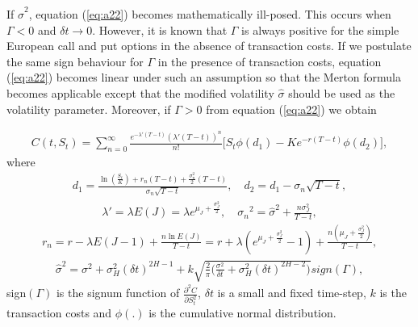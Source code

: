 \documentclass[a4paper,11pt]{amsart}
\numberwithin{equation}{section}
\theoremstyle{definition}
\theoremstyle{plain}
\theoremstyle{definition}
\newcommand{\1}{\mathbf{1}}
\begin{document}
If $\widehat{\sigma}^2$, equation (\ref{eq:a22}) becomes mathematically ill-posed. This occurs when $\Gamma<0$ and $\delta t\rightarrow 0$. However,
it is known that $\Gamma$ is always positive for the simple European call and put options in the absence of transaction costs. If
we postulate the same sign behaviour for $\Gamma$ in the presence of transaction costs, equation (\ref{eq:a22}) becomes linear under such an
assumption so that the Merton formula becomes applicable except that the modified volatility $\widehat{\sigma}$ should be used as the
volatility parameter. Moreover, if $\Gamma>0$ from equation (\ref{eq:a22}) we obtain

\begin{eqnarray}
C(t,S_t)=\sum_{n=0}^\infty\frac{e^{-\lambda'(T-t)}(\lambda'(T-t))^n}{n!}\Big[S_t\phi(d_1)-Ke^{-r(T-t)}\phi(d_2)\Big]\nonumber,
\label{eq:a24}
\end{eqnarray}
where
\begin{eqnarray}
d_1=\frac{\ln\left(\frac{S_t}{K}\right)+r_n(T-t)+\frac{\sigma_n^2}{2}(T-t)}{\sigma_n\sqrt{T-t}},\quad d_2=d_1-\sigma_n\sqrt{T-t}\nonumber,
\label{eq:a25}
\end{eqnarray}
\begin{eqnarray}
\lambda'=\lambda E(J)=\lambda e^{\mu_J+\frac{\sigma_J^2}{2}},\quad{\sigma_n}^2=\widehat{\sigma}^2+\frac{n\sigma_J^2}{T-t}\nonumber,
\label{eq:a26}
\end{eqnarray}
\begin{eqnarray}
r_n=r-\lambda E(J-1)+\frac{n\ln E(J)}{T-t}=r+\lambda (e^{\mu_J+\frac{\sigma_J^2}{2}}-1)+\frac{n(\mu_J+\frac{\sigma_J^2}{2})}{T-t}\nonumber,
\label{eq:a27}
\end{eqnarray}
\begin{eqnarray}
\widehat{\sigma}^2=\sigma^2+\sigma_H^2(\delta t)^{2H-1}+k\sqrt{\frac{2}{\pi}\Big(\frac{\sigma^2}{\delta t}+\sigma_H^2(\delta t)^{2H-2}\Big)}sign(\Gamma)\nonumber,
\label{eq:a28}
\end{eqnarray}
sign$(\Gamma)$ is the signum function of $\frac{\partial^2C}{\partial S_t^2}$, $\delta t$ is a small and fixed time-step, $k$ is the transaction costs and $\phi(.)$ is the cumulative normal distribution.



\end{document}
